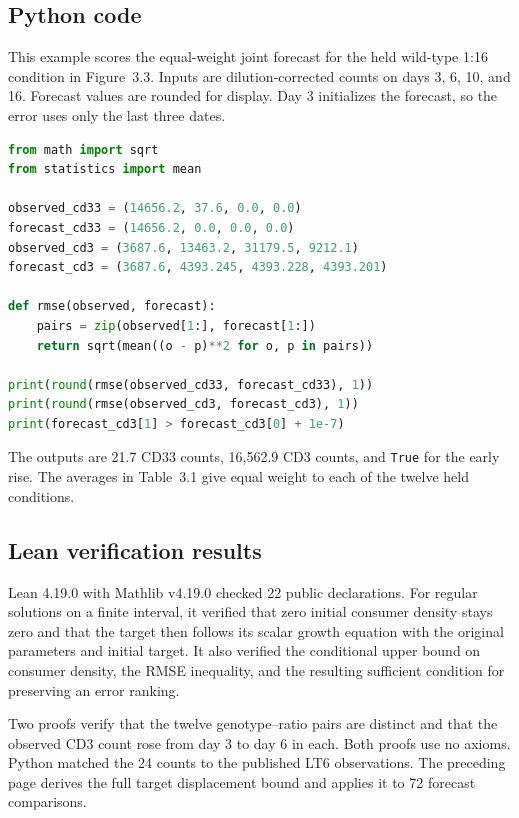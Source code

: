 \clearpage
\subsection*{Python code}
This example scores the equal-weight joint forecast for the held wild-type 1:16 condition in Figure~3.3. Inputs are dilution-corrected counts on days 3, 6, 10, and 16. Forecast values are rounded for display. Day 3 initializes the forecast, so the error uses only the last three dates.

\begin{lstlisting}[language=Python,basicstyle=\ttfamily\footnotesize]
from math import sqrt
from statistics import mean

observed_cd33 = (14656.2, 37.6, 0.0, 0.0)
forecast_cd33 = (14656.2, 0.0, 0.0, 0.0)
observed_cd3 = (3687.6, 13463.2, 31179.5, 9212.1)
forecast_cd3 = (3687.6, 4393.245, 4393.228, 4393.201)

def rmse(observed, forecast):
    pairs = zip(observed[1:], forecast[1:])
    return sqrt(mean((o - p)**2 for o, p in pairs))

print(round(rmse(observed_cd33, forecast_cd33), 1))
print(round(rmse(observed_cd3, forecast_cd3), 1))
print(forecast_cd3[1] > forecast_cd3[0] + 1e-7)
\end{lstlisting}
The outputs are 21.7 CD33 counts, 16,562.9 CD3 counts, and \texttt{True} for the early rise. The averages in Table~3.1 give equal weight to each of the twelve held conditions.

\subsection*{Lean verification results}
Lean 4.19.0 with Mathlib v4.19.0 checked 22 public declarations. For regular solutions on a finite interval, it verified that zero initial consumer density stays zero and that the target then follows its scalar growth equation with the original parameters and initial target. It also verified the conditional upper bound on consumer density, the RMSE inequality, and the resulting sufficient condition for preserving an error ranking.

Two proofs verify that the twelve genotype--ratio pairs are distinct and that the observed CD3 count rose from day 3 to day 6 in each. Both proofs use no axioms. Python matched the 24 counts to the published LT6 observations. The preceding page derives the full target displacement bound and applies it to 72 forecast comparisons.
